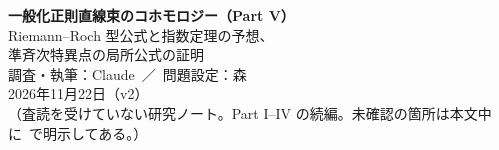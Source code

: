 

\sloppy
\begin{center}
{\LARGE\bfseries\sffamily 一般化正則直線束のコホモロジー（Part V）}\\[8pt]
{\large Riemann--Roch 型公式と指数定理の予想、\\準斉次特異点の局所公式の証明}\\[12pt]
{\large 調査・執筆：Claude\ ／\ 問題設定：森}\\[3pt]
2026年11月22日（v2）\\[3pt]
{\small （査読を受けていない研究ノート。Part I--IV の続編。未確認の箇所は本文中に\tQ\ で明示してある。）}
\end{center}
\begin{abstract}\noindent
(1) 対数 de Rham 複体の Euler 標数が $L$ に依らず $\chi(U)$ に等しいこと（定理 K1）、(2) $U$ がアフィンで $n$ が偶数のとき Poincar\'e 多項式が $\chi(X)$ と $h^k(U;L_U)$ で書けること（定理 K）、(3) 次元の 3 つの振る舞い（正則型の多項式、対数シンプレクティック型の周期的な跳び、全 Euler 標数の不変性）の対比、(4) 準斉次な孤立特異点をもつ平面曲線の茎の公式の $s\ne1$ での証明、(5) 指数定理の予想の正確な定式化と未証明部分、(6) 当初の目標に対する Part I--V の状態表、(7)（v2 で追加）全留数が非整数のとき $H^k(U;L_U)=0\ (k<n)$（定理 V）。指数予想は証明されていない。
\end{abstract}


